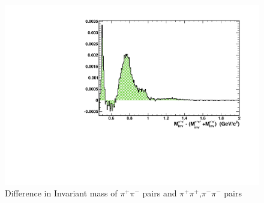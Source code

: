 \documentclass[abstract = on,listof=totoc, bibliography=totoc]{scrreprt}
\newcommand{\phir}{\phi_{R}}
\newcommand{\phis}{\phi_{S}}
\newcommand{\pip}{\pi^+}
\newcommand{\pim}{\pi^-}
\newcommand{\pair}{$\pip\pim$ }
\begin{document}
\begin{figure}
\begin{center}
\includegraphics[width = 1\textwidth]{diffInvMassSameOpp2}
\caption[Difference in the invariant mass of opposite and same sign pion pairs]{Difference in Invariant mass of \pair pairs and $\pi^+\pi^+$,$\pi^-\pi^-$ pairs}
\label{fig:dInvMSO}
\end{center}
\end{figure}

%
%
\end{document}
